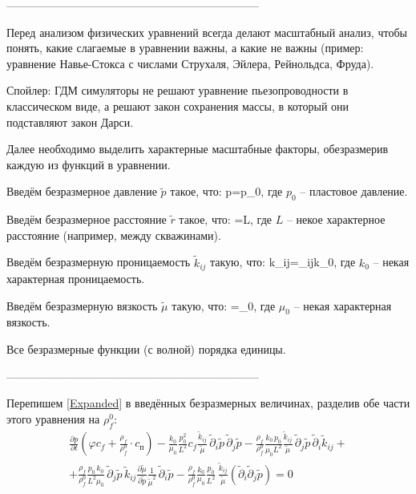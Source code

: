 \documentclass[main.tex]{subfiles}
\begin{document}
--------------------------------------------------------------------

Перед анализом физических уравнений всегда делают масштабный анализ, чтобы понять, какие слагаемые в уравнении важны, а какие не важны (пример: уравнение Навье-Стокса с числами Струхаля, Эйлера, Рейнольдса, Фруда).

Спойлер: ГДМ симуляторы не решают уравнение пьезопроводности в классическом виде, а решают закон сохранения массы, в который они подставляют закон Дарси.

Далее необходимо выделить характерные масштабные факторы, обезразмерив каждую из функций в уравнении.

Введём безразмерное давление $\tilde{p}$ такое, что:
\beq
p=\cdot p_0,
\eeq
где $p_0$ -- пластовое давление.

Введём безразмерное расстояние $\tilde{r}$ такое, что:
\beq
{}=\cdot L,
\eeq
где $L$ -- некое характерное расстояние (например, между скважинами).

Введём безразмерную проницаемость $\tilde{k}_{ij}$ такую, что:
\beq
k_{ij}=_{ij}\cdot k_0,
\eeq
где $k_0$ -- некая характерная проницаемость.

Введём безразмерную вязкость $\tilde{\mu}$ такую, что:
\beq
\mu=\tilde{\mu}\cdot\mu_0,
\eeq
где $\mu_0$ -- некая характерная вязкость.

Все безразмерные функции (с волной) порядка единицы.

--------------------------------------------------------------------

Перепишем \eqref{Expanded} в введённых безразмерных величинах, разделив обе части этого уравнения на $\rho_f^0$:
\begin{multline}
\frac{\partial p}{\partial t}\left(\varphi c_f+\frac{\rho_f}{\rho_f^0}\cdot c_\text{п}\right)-\frac{k_0}{\mu_0}\frac{p_0^2}{L^2}c_f\frac{\tilde{k}_{ij}}{\tilde{\mu}}\,\tilde{\partial}_i\tilde{p}\,\tilde{\partial}_j\tilde{p}-\frac{\rho_f}{\rho_f^0}\frac{k_0\,p_0}{\mu_0L^2}\frac{\tilde{k}_{ij}}{\tilde{\mu}}\,\tilde{\partial}_j\tilde{p}\,\tilde{\partial}_i\tilde{k}_{ij}+\\+\frac{\rho_f}{\rho_f^0}\frac{p_0\,k_0}{L^2\mu_0}\,\tilde{\partial}_j\tilde{p}\,\tilde{k}_{ij}\frac{\partial\tilde{\mu}}{\partial\tilde{p}}\frac{1}{\tilde{\mu}^2}\,\tilde{\partial}_i\tilde{p}-\frac{\rho_f}{\rho_f^0}\frac{k_0}{\mu_0}\frac{p_0}{L^2}\,\frac{\tilde{k}_{ij}}{\tilde{\mu}}\left(\tilde{\partial}_i\tilde{\partial}_j\tilde{p}\right)=0
\end{multline}
\end{document}
